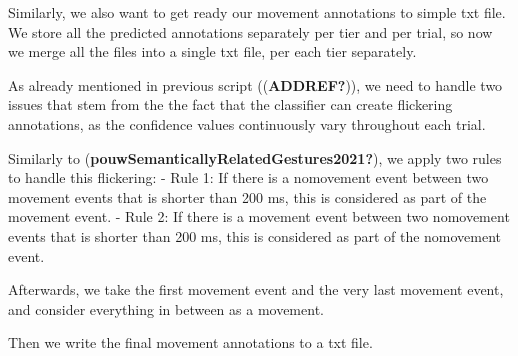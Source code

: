 \documentclass[
  letterpaper,
  DIV=11,
  numbers=noendperiod]{scrreprt}
\begin{document}
Similarly, we also want to get ready our movement annotations to simple
txt file. We store all the predicted annotations separately per tier and
per trial, so now we merge all the files into a single txt file, per
each tier separately.

As already mentioned in previous script ((\textbf{ADDREF?})), we need to
handle two issues that stem from the the fact that the classifier can
create flickering annotations, as the confidence values continuously
vary throughout each trial.

Similarly to (\textbf{pouwSemanticallyRelatedGestures2021?}), we apply
two rules to handle this flickering: - Rule 1: If there is a nomovement
event between two movement events that is shorter than 200 ms, this is
considered as part of the movement event. - Rule 2: If there is a
movement event between two nomovement events that is shorter than 200
ms, this is considered as part of the nomovement event.

Afterwards, we take the first movement event and the very last movement
event, and consider everything in between as a movement.

Then we write the final movement annotations to a txt file.
\end{document}

